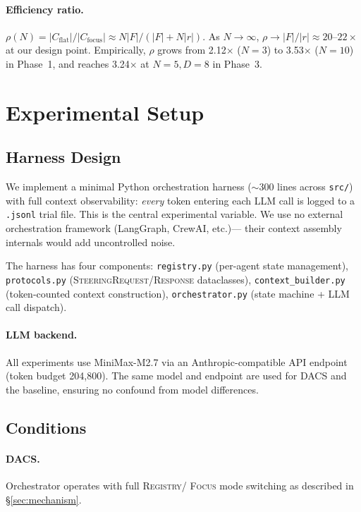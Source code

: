 \documentclass{article}
\begin{document}
\paragraph{Efficiency ratio.}
$\rho(N) = |C_{\text{flat}}| / |C_{\text{focus}}| \approx N|F| / (|F| +
N|r|)$.
As $N \to \infty$, $\rho \to |F| / |r| \approx 20$--$22\times$ at our
design point.
Empirically, $\rho$ grows from 2.12$\times$ ($N=3$) to 3.53$\times$
($N=10$) in Phase~1, and reaches 3.24$\times$ at $N=5, D=8$ in Phase~3.

\section{Experimental Setup}
\label{sec:experiments}

\subsection{Harness Design}
\label{sec:harness}

We implement a minimal Python orchestration harness ($\sim$300 lines
across \texttt{src/}) with full context observability: \emph{every} token
entering each LLM call is logged to a \texttt{.jsonl} trial file.
This is the central experimental variable.
We use no external orchestration framework (LangGraph, CrewAI, etc.)—
their context assembly internals would add uncontrolled noise.

The harness has four components:
\texttt{registry.py} (per-agent state management),
\texttt{protocols.py} (\textsc{SteeringRequest/Response} dataclasses),
\texttt{context\_builder.py} (token-counted context construction),
\texttt{orchestrator.py} (state machine + LLM call dispatch).

\paragraph{LLM backend.}
All experiments use MiniMax-M2.7 via an Anthropic-compatible API endpoint
(token budget 204{,}800).
The same model and endpoint are used for DACS and the baseline, ensuring
no confound from model differences.

\subsection{Conditions}
\label{sec:conditions}

\paragraph{DACS.} Orchestrator operates with full \textsc{Registry}/
\textsc{Focus} mode switching as described in \S\ref{sec:mechanism}.
\end{document}
